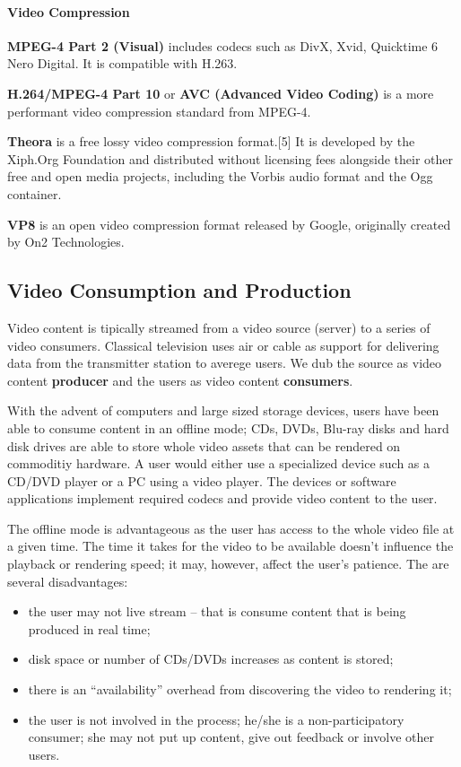 \paragraph{Video Compression}

\textbf{MPEG-4 Part 2 (Visual)} includes codecs such as DivX, Xvid, Quicktime
6 Nero Digital.  It is compatible with H.263.

\textbf{H.264/MPEG-4 Part 10} or \textbf{AVC (Advanced Video Coding)} is a
more performant video compression standard from MPEG-4.

\textbf{Theora} is a free lossy video compression format.[5] It is developed
by the Xiph.Org Foundation and distributed without licensing fees alongside
their other free and open media projects, including the Vorbis audio format
and the Ogg container.

\textbf{VP8} is an open video compression format released by Google,
originally created by On2 Technologies.

\subsection{Video Consumption and Production}
\label{subsec:multimedia-dist:video-consumption-production}

Video content is tipically streamed from a video source (server) to a series
of video consumers. Classical television uses air or cable as support for
delivering data from the transmitter station to averege users. We dub the
source as video content \textbf{producer} and the users as video content
\textbf{consumers}.

With the advent of computers and large sized storage devices, users have been
able to consume content in an offline mode; CDs, DVDs, Blu-ray disks and hard
disk drives are able to store whole video assets that can be rendered on
commoditiy hardware. A user would either use a specialized device such as a
CD/DVD player or a PC using a video player. The devices or software
applications implement required codecs and provide video content to the user.

The offline mode is advantageous as the user has access to the whole video
file at a given time. The time it takes for the video to be available doesn't
influence the playback or rendering speed; it may, however, affect the user's
patience. The are several disadvantages:
\begin{itemize}
  \item the user may not live stream -- that is consume content that is being
  produced in real time;
  \item disk space or number of CDs/DVDs increases as content is stored;
  \item there is an ``availability'' overhead from discovering the video to
  rendering it;
  \item the user is not involved in the process; he/she is a non-participatory
  consumer; she may not put up content, give out feedback or involve other
  users.
\end{itemize}

